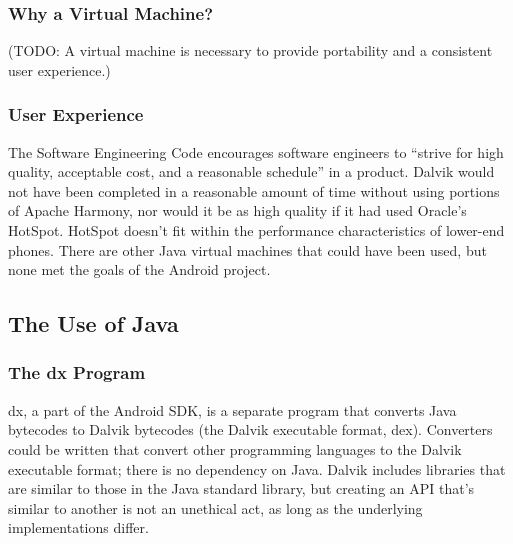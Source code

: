 \documentclass[11pt]{article}
\begin{document}
\begin{multicols}{2}

\subsubsection{Why a Virtual Machine?} %
\label{ssub:why-vm}

(TODO: A virtual machine is necessary to provide portability and a consistent
user experience.)


\subsubsection{User Experience} %
\label{ssub:quality}

The Software Engineering Code \cite{secode} encourages software engineers to
``strive for high quality, acceptable cost, and a reasonable schedule'' in a
product.  Dalvik would not have been completed in a reasonable amount of time
without using portions of Apache Harmony, nor would it be as high quality if it
had used Oracle's HotSpot.  HotSpot doesn't fit within the performance
characteristics of lower-end phones. \cite{dalvik-vm-arch} There are other Java
virtual machines that could have been used, but none met the goals of the
Android project.



\subsection{The Use of Java} %
\label{sub:java}

\subsubsection{The dx Program} %
\label{ssub:dex}

dx, a part of the Android SDK, is a separate program that converts Java
bytecodes to Dalvik bytecodes (the Dalvik executable format, dex).  Converters
could be written that convert other programming languages to the Dalvik
executable format; there is no dependency on Java.  Dalvik includes libraries
that are similar to those in the Java standard library, but creating an API
that's similar to another is not an unethical act, as long as the underlying
implementations differ.



\end{multicols}
\end{document}
